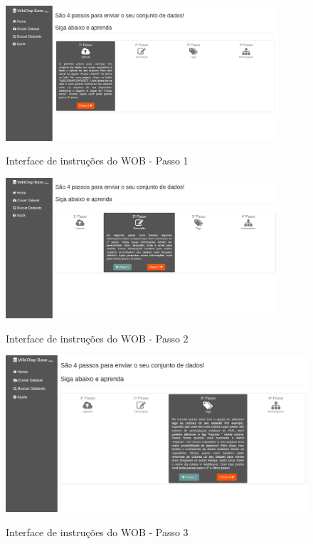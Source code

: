 \begin{figure}[!htb]
    \centering
    \caption{Interface de instruções do WOB - Passo 1}
    \includegraphics[width=0.9\textwidth]{./04-figuras/wob-ajuda}
    \label{fig:wob-ajuda}
\end{figure}

\begin{figure}[!htb]
    \centering
    \caption{Interface de instruções do WOB - Passo 2}
    \includegraphics[width=0.9\textwidth]{./04-figuras/wob-ajuda2}
    \label{fig:wob-ajuda2}
\end{figure}

\begin{figure}[!htb]
    \centering
    \caption{Interface de instruções do WOB - Passo 3}
    \includegraphics[width=1\textwidth]{./04-figuras/wob-ajuda3}
    \label{fig:wob-ajuda3}
\end{figure}


